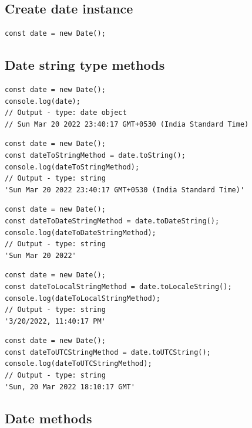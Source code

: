 \documentclass[10pt]{article}
\begin{document}
\hspace{1cm}

\subsection{Create date instance}
\begin{lstlisting}[style=ES6, caption={Date instance}]
const date = new Date();
\end{lstlisting}

\subsection{Date string type methods}
\begin{lstlisting}[style=ES6, caption={Output of Date}]
const date = new Date();
console.log(date);
// Output - type: date object
// Sun Mar 20 2022 23:40:17 GMT+0530 (India Standard Time)
\end{lstlisting}

\begin{lstlisting}[style=ES6, caption={Date to String}]
const date = new Date();
const dateToStringMethod = date.toString();
console.log(dateToStringMethod);
// Output - type: string
'Sun Mar 20 2022 23:40:17 GMT+0530 (India Standard Time)'
\end{lstlisting}

\begin{lstlisting}[style=ES6, caption={Date to Date String}]
const date = new Date();
const dateToDateStringMethod = date.toDateString();
console.log(dateToDateStringMethod);
// Output - type: string
'Sun Mar 20 2022'
\end{lstlisting}

\begin{lstlisting}[style=ES6, caption={Date to Local String}]
const date = new Date();
const dateToLocalStringMethod = date.toLocaleString();
console.log(dateToLocalStringMethod);
// Output - type: string
'3/20/2022, 11:40:17 PM'
\end{lstlisting}

\begin{lstlisting}[style=ES6, caption={Date to UTC String}]
const date = new Date();
const dateToUTCStringMethod = date.toUTCString();
console.log(dateToUTCStringMethod);
// Output - type: string
'Sun, 20 Mar 2022 18:10:17 GMT'
\end{lstlisting}

\subsection{Date methods}
\end{document}

